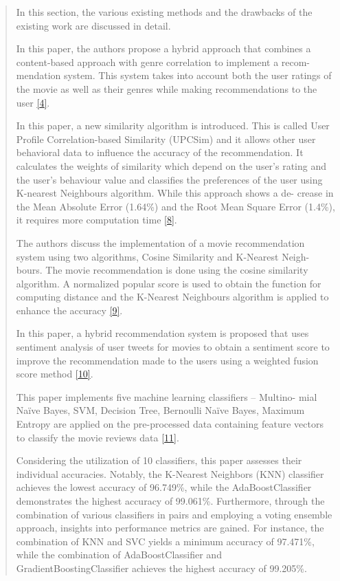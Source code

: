 \documentclass[
]{article}
\begin{document}
\begin{quote}
In this section, the various existing methods and the drawbacks of the
existing work are discussed in detail.

In this paper, the authors propose a hybrid approach that combines a
content-based approach with genre correlation to implement a recom-
mendation system. This system takes into account both the user ratings
of the movie as well as their genres while making recommendations to the
user \protect\hyperlink{_bookmark24}{{[}4{]}}.

In this paper, a new similarity algorithm is introduced. This is called
User Proﬁle Correlation-based Similarity (UPCSim) and it allows other
user behavioral data to inﬂuence the accuracy of the recommendation. It
calculates the weights of similarity which depend on the user's rating
and the user's behaviour value and classiﬁes the preferences of the user
using K-nearest Neighbours algorithm. While this approach shows a de-
crease in the Mean Absolute Error (1.64\%) and the Root Mean Square
Error (1.4\%), it requires more computation time
\protect\hyperlink{_bookmark28}{{[}8{]}}.

The authors discuss the implementation of a movie recommendation system
using two algorithms, Cosine Similarity and K-Nearest Neigh- bours. The
movie recommendation is done using the cosine similarity algorithm. A
normalized popular score is used to obtain the function for computing
distance and the K-Nearest Neighbours algorithm is applied to enhance
the accuracy \protect\hyperlink{_bookmark29}{{[}9{]}}.

In this paper, a hybrid recommendation system is proposed that uses
sentiment analysis of user tweets for movies to obtain a sentiment score
to improve the recommendation made to the users using a weighted fusion
score method \protect\hyperlink{_bookmark30}{{[}10{]}}.

This paper implements ﬁve machine learning classiﬁers -- Multino- mial
Naïve Bayes, SVM, Decision Tree, Bernoulli Naïve Bayes, Maximum Entropy
are applied on the pre-processed data containing feature vectors to
classify the movie reviews data
\protect\hyperlink{_bookmark31}{{[}11{]}}.

Considering the utilization of 10 classifiers, this paper assesses their
individual accuracies. Notably, the K-Nearest Neighbors (KNN) classifier
achieves the lowest accuracy of 96.749\%, while the AdaBoostClassifier
demonstrates the highest accuracy of 99.061\%. Furthermore, through the
combination of various classifiers in pairs and employing a voting
ensemble approach, insights into performance metrics are gained. For
instance, the combination of KNN and SVC yields a minimum accuracy of
97.471\%, while the combination of AdaBoostClassifier and
GradientBoostingClassifier achieves the highest accuracy of 99.205\%.
\end{quote}
\end{document}

